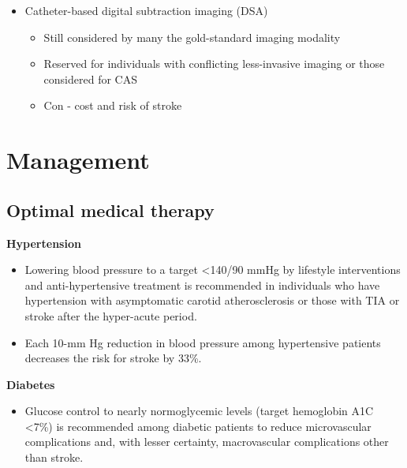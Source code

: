 \documentclass[
]{book}
\providecommand{\tightlist}{%
  \setlength{\itemsep}{0pt}\setlength{\parskip}{0pt}}
\begin{document}
\begin{enumerate}
\begin{itemize}
    \begin{itemize}
    \item
      Pro - no contrast administered; analyze plaque morphology
    \item
      Con - Does not visualize calcium in plaque; overestimates
      the degree of stenosis (False positive for 50-69\% to be read
      as \textgreater70\%)
    \end{itemize}
  \item
    Catheter-based digital subtraction imaging (DSA)

    \begin{itemize}
    \item
      Still considered by many the gold-standard imaging modality
    \item
      Reserved for individuals with conflicting less-invasive
      imaging or those considered for CAS
    \item
      Con - cost and risk of stroke
    \end{itemize}
  \end{itemize}
\end{enumerate}

\hypertarget{management}{%
\section{Management}\label{management}}

\hypertarget{optimal-medical-therapy}{%
\subsection{\texorpdfstring{\textbf{Optimal medical therapy}}{Optimal medical therapy}}\label{optimal-medical-therapy}}

\textbf{Hypertension}

\begin{itemize}
\item
  Lowering blood pressure to a target \textless140/90 mmHg by lifestyle
  interventions and anti-hypertensive treatment is recommended in
  individuals who have hypertension with asymptomatic carotid
  atherosclerosis or those with TIA or stroke after the hyper-acute
  period.
\item
  Each 10-mm Hg reduction in blood pressure among hypertensive
  patients decreases the risk for stroke by 33\%.
\end{itemize}

\textbf{Diabetes}

\begin{itemize}
\tightlist
\item
  Glucose control to nearly normoglycemic levels (target hemoglobin
  A1C \textless7\%) is recommended among diabetic patients to reduce
  microvascular complications and, with lesser certainty,
  macrovascular complications other than stroke.
\end{itemize}
\end{document}
